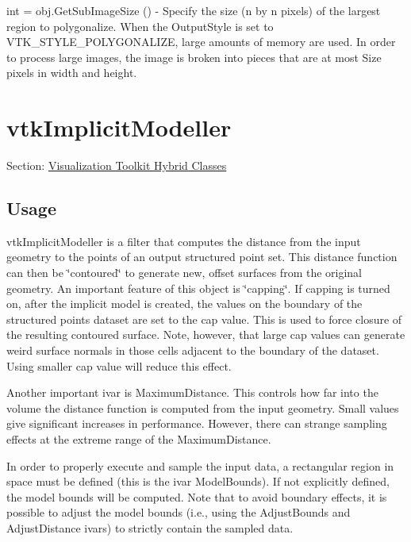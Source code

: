 \begin{DoxyItemize}
\item {\ttfamily int = obj.\-Get\-Sub\-Image\-Size ()} -\/ Specify the size (n by n pixels) of the largest region to polygonalize. When the Output\-Style is set to V\-T\-K\-\_\-\-S\-T\-Y\-L\-E\-\_\-\-P\-O\-L\-Y\-G\-O\-N\-A\-L\-I\-Z\-E, large amounts of memory are used. In order to process large images, the image is broken into pieces that are at most Size pixels in width and height.  
\end{DoxyItemize}\hypertarget{vtkhybrid_vtkimplicitmodeller}{}\section{vtk\-Implicit\-Modeller}\label{vtkhybrid_vtkimplicitmodeller}
Section\-: \hyperlink{sec_vtkhybrid}{Visualization Toolkit Hybrid Classes} \hypertarget{vtkwidgets_vtkxyplotwidget_Usage}{}\subsection{Usage}\label{vtkwidgets_vtkxyplotwidget_Usage}
vtk\-Implicit\-Modeller is a filter that computes the distance from the input geometry to the points of an output structured point set. This distance function can then be \char`\"{}contoured\char`\"{} to generate new, offset surfaces from the original geometry. An important feature of this object is \char`\"{}capping\char`\"{}. If capping is turned on, after the implicit model is created, the values on the boundary of the structured points dataset are set to the cap value. This is used to force closure of the resulting contoured surface. Note, however, that large cap values can generate weird surface normals in those cells adjacent to the boundary of the dataset. Using smaller cap value will reduce this effect. 

Another important ivar is Maximum\-Distance. This controls how far into the volume the distance function is computed from the input geometry. Small values give significant increases in performance. However, there can strange sampling effects at the extreme range of the Maximum\-Distance. 

In order to properly execute and sample the input data, a rectangular region in space must be defined (this is the ivar Model\-Bounds). If not explicitly defined, the model bounds will be computed. Note that to avoid boundary effects, it is possible to adjust the model bounds (i.\-e., using the Adjust\-Bounds and Adjust\-Distance ivars) to strictly contain the sampled data. 

